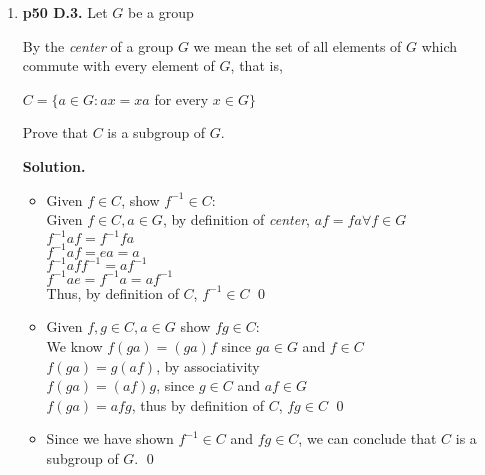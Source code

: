 \documentclass[11pt]{article}
\begin{document}
\begin{enumerate}
  Since we have shown $x^{-1} \in H \cap K$ and $xy \in H \cap K$, we can conclude that $H \cap K$ is a subgroup of $G$. \qed \\

\item {\bfseries p50 D.3.} Let $G$ be a group
  
  By the \textit{center} of a group $G$ we mean the set of all elements of $G$ which commute with every element of $G$, that is,
  
  $C = \{ a \in G : ax = xa$ for every $x \in G\}$
  
  Prove that $C$ is a subgroup of $G$.
  
  {\bfseries Solution.}
  
  \begin{itemize}
	  \item Given $f \in C$, show $f^{-1} \in C$: \\
	  Given $f \in C, a \in G$, by definition of \textit{center}, $af = fa \forall f \in G$ \\
	  $f^{-1}af = f^{-1}fa$ \\
	  $f^{-1}af = ea = a$ \\
	  $f^{-1}aff^{-1} = af^{-1}$ \\
	  $f^{-1}ae = f^{-1}a = af^{-1}$ \\
	  Thus, by definition of $C$, $f^{-1} \in C$ \qed \\
	  
	  \item Given $f,g \in C, a \in G$ show $fg \in C$: \\
	  We know $f(ga) = (ga)f$ since $ga \in G$ and $f \in C$ \\
	  $f(ga) = g(af)$, by associativity \\
	  $f(ga) = (af)g$, since $g \in C$ and $af \in G$ \\
	  $f(ga) = afg$, thus by definition of $C$, $fg \in C$ \qed \\
	  
	  \item Since we have shown $f^{-1} \in C$ and $fg \in C$, we can conclude that $C$ is a subgroup of $G$. \qed
  
  \end{itemize}


\end{enumerate}
\end{document}
